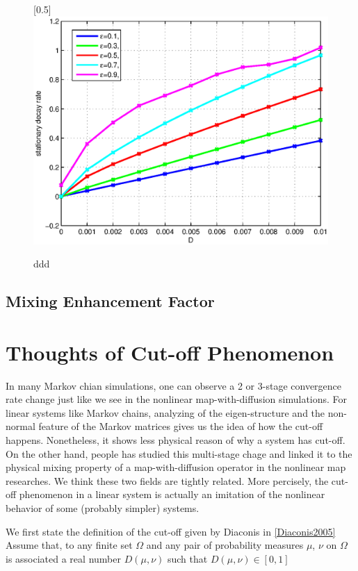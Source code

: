 \documentclass{article}
\begin{document}
\begin{figure}
 \centerline{
  \scalebox{0.5}[0.5]{\includegraphics{Dvslambda.eps}}
} \caption{ddd}
  \label{Dvslambda}
\end{figure}


\subsection{Mixing Enhancement Factor}

\section{Thoughts of Cut-off Phenomenon}
\label{Thoughts of Cut-off Phenomenon}
In many Markov chian simulations, one can observe a 2 or 3-stage
convergence rate change just like we see in the nonlinear
map-with-diffusion simulations. For linear systems like Markov
chains, analyzing of the eigen-structure and the non-normal feature
of the Markov matrices gives us the idea of how the cut-off happens.
Nonetheless, it shows less physical reason of why a system has
cut-off. On the other hand, people has studied this multi-stage
chage and linked it to the physical mixing property of a
map-with-diffusion operator in the nonlinear map researches. We
think these two fields are tightly related. More percisely, the
cut-off phenomenon in a linear system is actually an imitation of
the nonlinear behavior of some (probably simpler) systems.


We first state the definition of the cut-off given by Diaconis in
\ref{Diaconis2005} Assume that, to any finite set $\Omega$ and any
pair of probability measures $\mu$, $\nu$ on $\Omega$ is associated
a real number $D(\mu,\nu)$ such that $D(\mu,\nu)\in [0,1]$
\end{document}
